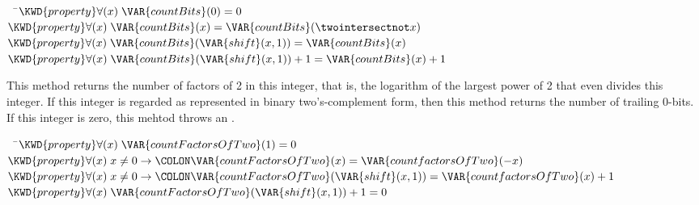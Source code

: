 \begin{Fortress}
{\tt~~}\pushtabs\=\+\(  \KWD{property} \forall(x)\; \VAR{countBits}(0) = 0\)\\
\(  \KWD{property} \forall(x)\; \VAR{countBits}(x) = \VAR{countBits}(\twointersectnot x)\)\\
\(  \KWD{property} \forall(x)\; \VAR{countBits}(\VAR{shift}(x,1)) = \VAR{countBits}(x)\)\\
\(  \KWD{property} \forall(x)\; \VAR{countBits}(\VAR{shift}(x,1)) + 1 = \VAR{countBits}(x) + 1\)\-\\\poptabs
\end{Fortress}



This method returns the number of factors of 2 in this integer, that is,
the logarithm of the largest power of 2 that even divides this integer.
If this integer is regarded as represented in binary two's-complement form,
then this method returns the number of trailing 0-bits.
If this integer is zero, this mehtod throws an .

\begin{Fortress}
{\tt~~}\pushtabs\=\+\(  \KWD{property} \forall(x)\; \VAR{countFactorsOfTwo}(1) = 0\)\\
\(  \KWD{property} \forall(x)\; x \neq 0 \rightarrow\COLON \VAR{countFactorsOfTwo}(x) = \VAR{countfactorsOfTwo}(-x)\)\\
\(  \KWD{property} \forall(x)\; x \neq 0 \rightarrow\COLON \VAR{countFactorsOfTwo}(\VAR{shift}(x,1)) = \VAR{countfactorsOfTwo}(x) + 1\)\\
\(  \KWD{property} \forall(x)\; \VAR{countFactorsOfTwo}(\VAR{shift}(x,1)) + 1 = 0\)\-\\\poptabs
\end{Fortress}



